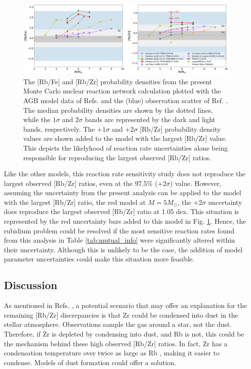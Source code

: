 \begin{figure}
\centering
\includegraphics[width=6.5in]{Chapter-3/figs/RbAbund_Bands.png}
\caption{\label{fig:RbProblem_Bands}The [Rb/Fe] and [Rb/Zr] probability densities from the present Monte Carlo nuclear reaction network calculation plotted with the AGB model data of Refs. \cite{Karakas2012,Raai2012,Karakas2016,Pignatari2016} and the (blue) observation scatter of Ref. \cite{Perez2017}. The median probability densities are shown by the dotted lines, while the $1\sigma$ and $2\sigma$ bands are represented by the dark and light bands, respectively. The $+1\sigma$ and $+2\sigma$ [Rb/Zr] probability density values are shown added to the model with the largest [Rb/Zr] value. This depicts the likelyhood of reaction rate uncertainties alone being responsible for reproducing the largest observed [Rb/Zr] ratios.}
\end{figure}

Like the other models, this reaction rate sensitivity study does not reproduce the largest observed [Rb/Zr] ratios, even at the 97.5$\%$ ($+2\sigma$) value. However, assuming the uncertainty from the present analysis can be applied to the model with the largest [Rb/Zr] ratio, the red model at $M = 5 M_{\odot}$, the $+2\sigma$ uncertainty does reproduce the largest observed [Rb/Zr] ratio at 1.05 dex. This situation is represented by the red uncertainty bars added to this model in Fig. \ref{fig:RbProblem_Bands}. Hence, the rubidium problem could be resolved if the most sensitive reaction rates found from this analysis in Table \ref{tab:mutual_info} were significantly altered within their uncertainty. Although this is unlikely to be the case, the addition of model parameter uncertainties could make this situation more feasible.

\subsection{Discussion}

As mentioned in Refs. \cite{Raai2012,Perez2017}, a potential scenario that may offer an explanation for the remaining [Rb/Zr] discrepancies is that Zr could be condensed into dust in the stellar atmosphere. Observations sample the gas around a star, not the dust. Therefore, if Zr is depleted by condensing into dust, and Rb is not, this could be the mechanism behind these high observed [Rb/Zr] ratios. In fact, Zr has a condensation temperature over twice as large as Rb \cite{Raai2012}, making it easier to condense. Models of dust formation could offer a solution.

